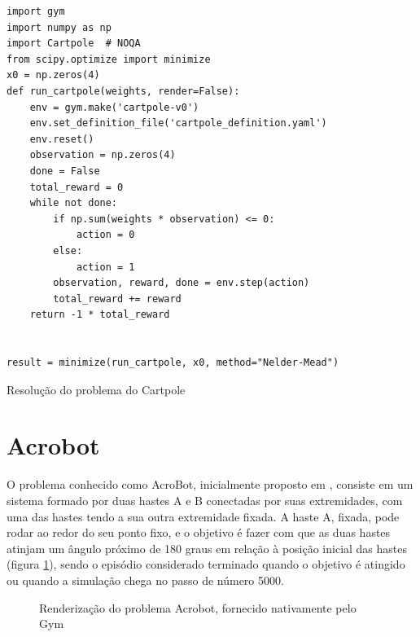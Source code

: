 \documentclass[cic,tc]{iiufrgs}
\newenvironment{longlisting}{\captionsetup{type=listing}}{}
\begin{document}
\begin{longlisting}
\begin{verbatim}
import gym
import numpy as np
import Cartpole  # NOQA
from scipy.optimize import minimize
x0 = np.zeros(4)
def run_cartpole(weights, render=False):
    env = gym.make('cartpole-v0')
    env.set_definition_file('cartpole_definition.yaml')
    env.reset()
    observation = np.zeros(4)
    done = False
    total_reward = 0
    while not done:
        if np.sum(weights * observation) <= 0:
            action = 0
        else:
            action = 1
        observation, reward, done = env.step(action)
        total_reward += reward
    return -1 * total_reward


result = minimize(run_cartpole, x0, method="Nelder-Mead")
\end{verbatim}
\caption[Cópia de DNA]{Resolução do problema do Cartpole}
\label{source:cartpole_solution}
\end{longlisting}


\section{Acrobot}
O problema conhecido como AcroBot, inicialmente proposto em \cite{AcroBot1996},
consiste em um sistema formado por duas hastes A e B conectadas por suas extremidades,
com uma das hastes tendo a sua outra extremidade fixada. A haste A, fixada, pode
rodar ao redor do seu ponto fixo, e o objetivo é fazer com que as duas hastes
atinjam um ângulo próximo de 180 graus em relação à posição inicial das hastes
(figura \ref{fig:acrobot_gym}), sendo o episódio considerado terminado quando
o objetivo é atingido ou quando a simulação chega no passo de número 5000.

\begin{figure}[h]
  \begin{center}
  \caption{Renderização do problema Acrobot, fornecido nativamente pelo Gym}
  \label{fig:acrobot_gym}
\end{center}
\end{figure}
\end{document}
